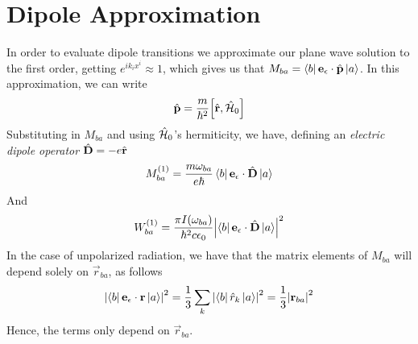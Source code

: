\documentclass[../qm.tex]{subfiles}
\begin{document}
	\section{Dipole Approximation}
	In order to evaluate dipole transitions we approximate our plane wave solution to the first order, getting $e^{ik_ix^i}\approx1$, which gives us that $M_{ba}=\bra{b}\mathbf{e}_{\epsilon}\cdot\hat{\mathbf{p}}\ket{a}$. In this approximation, we can write
	\begin{equation*}
		\vecopr{p}=\frac{m}{\hbar^2}\comm{\vecopr{r}}{\opr{\ham}_0}
	\end{equation*}
	Substituting in $M_{ba}$ and using $\hat{\mathcal{H}}_0$'s hermiticity, we have, defining an \textit{electric dipole operator} $\hat{\mathbf{D}}=-e\hat{\mathbf{r}}$
	\begin{equation}
		M_{ba}^{(1)}=\frac{m\omega_{ba}}{e\hbar}\bra{b}\mathbf{e}_{\epsilon}\cdot\hat{\mathbf{D}}\ket{a}
		\label{eq:mbadipole}
	\end{equation}
	And
	\begin{equation}
		W_{ba}^{(1)}=\frac{\pi I(\omega_{ba})}{\hbar^2c\epsilon_0}\abs{\bra{b}\mathbf{e}_{\epsilon}\cdot\hat{\mathbf{D}}\ket{a}}^2
		\label{eq:transprobdipole}
	\end{equation}
	In the case of unpolarized radiation, we have that the matrix elements of $M_{ba}$ will depend solely on $\vec{r}_{ba}$, as follows
	\begin{equation}
		\abs{\bra{b}\mathbf{e}_{\epsilon}\cdot\mathbf{r}\ket{a}}^2=\frac{1}{3}\sum_k\abs{\bra{b}\hat{r}_k\ket{a}}^2=\frac{1}{3}\abs{\mathbf{r}_{ba}}^2
		\label{eq:mbadipoletransunpol}
	\end{equation}
	Hence, the terms only depend on $\vec{r}_{ba}$.
\end{document}
